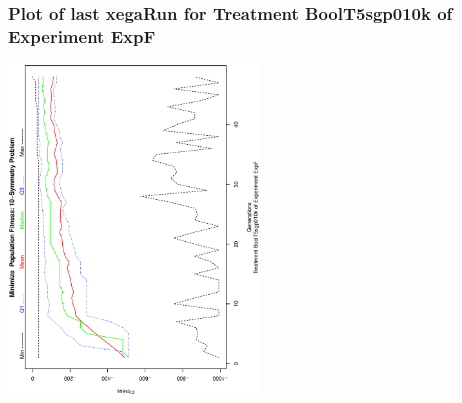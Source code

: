  \begin{frame}
 \frametitle{ Plot of last xegaRun for Treatment BoolT5sgp010k of Experiment ExpF }
 \begin{center}
\includegraphics[width=0.5\textwidth, angle=-90]
{ExpFPlotPopStatsFigure008.eps}
 \end{center}
 \label{templateReport/ExpFPlotPopStatsFigure008.eps}  
 \end{frame}

